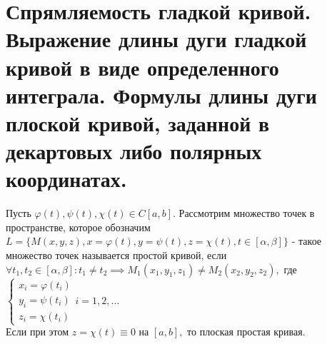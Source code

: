 \documentclass[../main.tex]{subfiles}
\begin{document}
\section{Спрямляемость гладкой кривой. Выражение длины дуги гладкой кривой в виде определенного интеграла. Формулы длины дуги плоской кривой, заданной в декартовых либо полярных координатах.}
\begin{definition}
    Пусть $\varphi(t),\psi(t),\chi(t)\in C[a,b].$ Рассмотрим множество точек в пространстве, которое обозначим $L=\{M(x,y,z), x=\varphi(t),y=\psi(t),z=\chi(t),t\in[\alpha,\beta]\}$ - такое множество точек называется простой кривой, если
    $ \forall t_{1},t_{2}\in[\alpha,\beta] : t_{1}\neq t_{2}\implies M_{1}(x_{1},y_{1},z_{1})\neq M_{2}(x_{2},y_{2},z_{2}),$ где $\begin{cases}x_{i}=\varphi(t_{i})\\ y_{i}=\psi(t_{i})\\z_{i}=\chi(t_{i})\end{cases}i=1,2,\dots$
   \\ Если при этом $z=\chi(t) \equiv 0 \text{ на }[a,b],$ то плоская простая кривая.
\end{definition}
\end{document}
